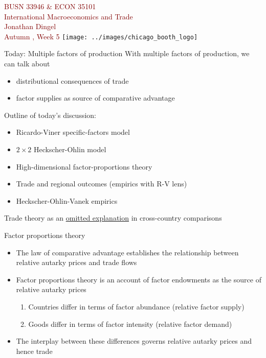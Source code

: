 \documentclass[10pt,notes=hide]{beamer}
\begin{document}
\begin{frame}[plain]
\begin{center}
\large
\textcolor{maroon}{BUSN 33946 \& ECON 35101\\
International Macroeconomics and Trade\\ 
Jonathan Dingel\\
Autumn \the\year, Week 5}
\vfill 
\texttt{[image: ../images/chicago\_booth\_logo]}
\end{center}
\end{frame}
\begin{frame}{Today: Multiple factors of production}
With multiple factors of production, we can talk about
\begin{itemize}
	\item distributional consequences of trade
	\item factor supplies as source of comparative advantage
\end{itemize}
Outline of today's discussion:
\begin{itemize}
	\item Ricardo-Viner specific-factors model
	\item $2 \times 2$ Heckscher-Ohlin model
	\item High-dimensional factor-proportions theory
	\item Trade and regional outcomes (empirics with R-V lens)
	\item Heckscher-Ohlin-Vanek empirics
\end{itemize}
Trade theory as an \href{https://twitter.com/TradeDiversion/status/1445739902105128963}{omitted explanation} in cross-country comparisons
\end{frame}
\begin{frame}{Factor proportions theory}
\begin{itemize}
	\item The law of comparative advantage establishes the relationship between relative autarky prices and trade flows
	\item Factor proportions theory is an account of factor endowments as the source of relative autarky prices
	\begin{enumerate}
		\item Countries differ in terms of factor abundance (relative factor supply)
		\item Goods differ in terms of factor intensity (relative factor demand)
	\end{enumerate}
	\item The interplay between these differences governs relative autarky prices and hence trade
\end{itemize}
\end{frame}
\end{document}
